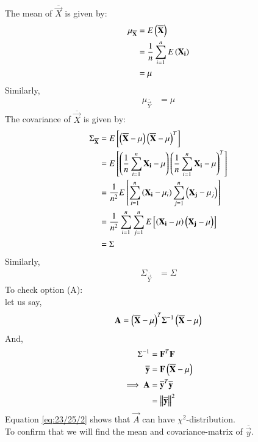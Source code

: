 \documentclass[journal,12pt,onecolumn]{IEEEtran}
\theoremstyle{remark}
\begin{document}
The mean of $\overline{\vec{X}}$ is given by: 
\begin{align}
{\mu}_{\overline{\mathbf{X}}} &= E\left(\overline{\mathbf{X}}\right) \\
                                    &= \frac{1}{n}\sum_{i=1}^{n}E\left(\mathbf{X_i}\right) \\
                                    &= \mu  \label{eq:23/25/1}
\end{align}
Similarly,
\begin{align}
{\mu}_{\overline{\vec{Y}}} &= \mu
\end{align}
The covariance of $\overline{\vec{X}}$ is given by: 
\begin{align}
\Sigma_{\overline{\mathbf{X}}} &= E{}\left[\left(\overline{\mathbf{X}}-\mu\right){\left(\overline{\mathbf{X}}-\mu\right)}^T\right] \\
                            &= E{}\left[\left(\frac{1}{n}\sum_{i=1}^{n}\mathbf{X_i}-\mu\right){\left(\frac{1}{n}\sum_{i=1}^{n}\mathbf{X_i}-\mu\right)}^T\right] \\
                            &= \frac{1}{n^2}E{}\left[\sum_{i=1}^{n}\left(\mathbf{X_i}-{\mu}_i\right)\sum_{j=1}^{n}\left(\mathbf{X_j}-{\mu}_j\right)\right] \\
                            &= \frac{1}{n^2}\sum_{i=1}^{n}\sum_{j=1}^{n}E{}\left[\left(\mathbf{X_i}-\mu\right)\left(\mathbf{X_j}-\mu\right)\right] \\
                            &= \Sigma
\end{align}
Similarly,
\begin{align}
\Sigma_{\overline{\vec{Y}}} &= \Sigma 
\end{align}
To check option (A): \\
let us say,
\begin{align}
\mathbf{A} &= {\left(\overline{\mathbf{X}}-\mathbf{\mu}\right)}^T{\Sigma}^{-1}\left(\overline{\mathbf{X}}-\mathbf{\mu}\right) \\
\end{align}
And,
\begin{align}
{\Sigma}^{-1} &= {\mathbf{F}}^T\mathbf{F} \label{eq:23/25/3} \\
\overline{\mathbf{y}} &= \mathbf{F}\left(\overline{\mathbf{X}}-\mu\right) \\
\implies \mathbf{A} &= {\overline{\mathbf{y}}}^T\overline{\mathbf{y}} \\
                 &= {\left\lVert\overline{\mathbf{y}}\right\rVert}^2  \label{eq:23/25/2}
\end{align}
Equation \eqref{eq:23/25/2} shows that $\vec{A}$ can have ${\chi}^2$-distribution. \\
To confirm that we will find the mean and covariance-matrix of $\overline{\vec{y}}$.
\end{document}

